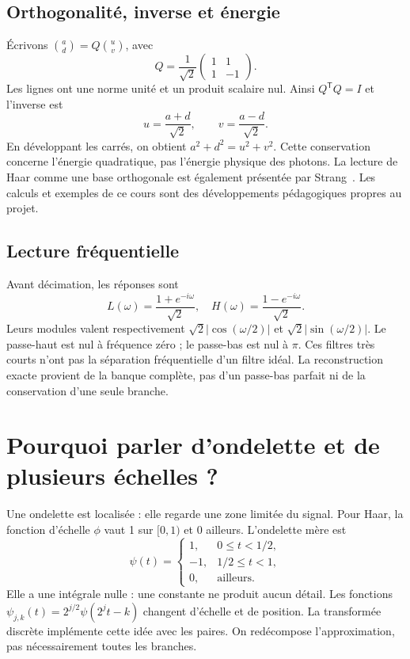\subsection{Orthogonalité, inverse et énergie}
Écrivons $\binom{a}{d}=Q\binom{u}{v}$, avec
\begin{equation}
Q=\frac{1}{\sqrt{2}}\begin{pmatrix}1&1\\1&-1\end{pmatrix}.
\end{equation}
Les lignes ont une norme unité et un produit scalaire nul.
Ainsi $Q^{\mathsf T}Q=I$ et l'inverse est
\begin{equation}
u=\frac{a+d}{\sqrt{2}},\qquad v=\frac{a-d}{\sqrt{2}}.
\end{equation}
En développant les carrés, on obtient $a^2+d^2=u^2+v^2$.
Cette conservation concerne l'énergie quadratique, pas l'énergie physique
des photons. La lecture de Haar comme une base orthogonale est également
présentée par Strang~\cite{strangHaar}. Les calculs et exemples de ce cours
sont des développements pédagogiques propres au projet.

\subsection{Lecture fréquentielle}
Avant décimation, les réponses sont
\begin{equation}
L(\omega)=\frac{1+e^{-i\omega}}{\sqrt{2}},\quad
H(\omega)=\frac{1-e^{-i\omega}}{\sqrt{2}}.
\end{equation}
Leurs modules valent respectivement
$\sqrt{2}|\cos(\omega/2)|$ et $\sqrt{2}|\sin(\omega/2)|$.
Le passe-haut est nul à fréquence zéro ; le passe-bas est nul à $\pi$.
Ces filtres très courts n'ont pas la séparation fréquentielle d'un filtre
idéal. La reconstruction exacte provient de la banque complète, pas d'un
passe-bas parfait ni de la conservation d'une seule branche.

\section{Pourquoi parler d'ondelette et de plusieurs échelles ?}
Une ondelette est localisée : elle regarde une zone limitée du signal.
Pour Haar, la fonction d'échelle $\phi$ vaut 1 sur $[0,1)$ et 0 ailleurs.
L'ondelette mère est
\begin{equation}
\psi(t)=\begin{cases}
1,&0\le t<1/2,\\-1,&1/2\le t<1,\\0,&\text{ailleurs}.
\end{cases}
\end{equation}
Elle a une intégrale nulle : une constante ne produit aucun détail.
Les fonctions $\psi_{j,k}(t)=2^{j/2}\psi(2^j t-k)$ changent d'échelle et
de position. La transformée discrète implémente cette idée avec les paires.
On redécompose l'approximation, pas nécessairement toutes les branches.


